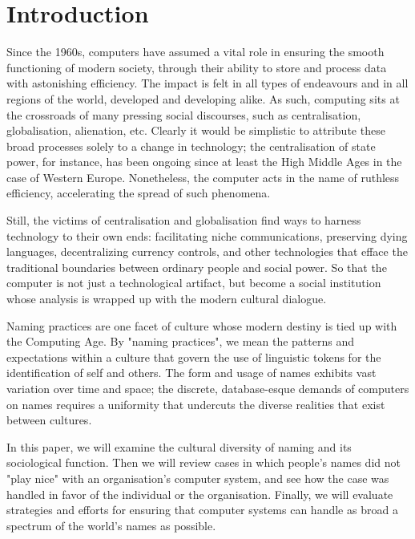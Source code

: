 \section{Introduction}

Since the 1960s, computers have assumed a vital role in ensuring the smooth
functioning of modern society, through their ability to store and process data
with astonishing efficiency. The impact is felt in all types of endeavours and
in all regions of the world, developed and developing alike. As such, computing
sits at the crossroads of many pressing social discourses, such as centralisation,
globalisation, alienation, etc. Clearly it would be simplistic to attribute
these broad processes solely to a change in technology; the centralisation of
state power, for instance, has been ongoing since at least the High Middle Ages
in the case of Western Europe. Nonetheless, the computer acts in the name of
ruthless efficiency, accelerating the spread of such phenomena.

Still, the victims of centralisation and globalisation find ways to harness
technology to their own ends: facilitating niche communications, preserving
dying languages, decentralizing currency controls, and other technologies that
efface the traditional boundaries between ordinary people and social power. So
that the computer is not just a technological artifact, but become a social
institution whose analysis is wrapped up with the modern cultural dialogue.

Naming practices are one facet of culture whose modern destiny is tied up with the
Computing Age. By "naming practices", we mean the patterns and expectations
within a culture that govern the use of linguistic tokens for the
identification of self and others. The form and usage of names exhibits vast
variation over time and space; the discrete, database-esque demands of computers
on names requires a uniformity that undercuts the diverse realities that exist
between cultures.

In this paper, we will examine the cultural diversity of naming and its
sociological function. Then we will review cases in which people's names did
not "play nice" with an organisation's computer system, and see how the case was
handled in favor of the individual or the organisation. Finally, we will
evaluate strategies and efforts for ensuring that computer systems can handle as
broad a spectrum of the world's names as possible.
